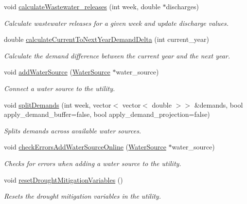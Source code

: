 \begin{DoxyCompactItemize}
void \mbox{\hyperlink{classUtility_a5feecc73d561de022eb6ba3c657b3dbc}{calculate\+Wastewater\+\_\+releases}} (int week, double $\ast$discharges)
\begin{DoxyCompactList}\small\item\em Calculate wastewater releases for a given week and update discharge values. \end{DoxyCompactList}\item 
double \mbox{\hyperlink{classUtility_a38381b003d13986e37757dfea683f7f9}{calculate\+Current\+To\+Next\+Year\+Demand\+Delta}} (int current\+\_\+year)
\begin{DoxyCompactList}\small\item\em Calculate the demand difference between the current year and the next year. \end{DoxyCompactList}\item 
void \mbox{\hyperlink{classUtility_aebbfd65c13e86cfeda8bdfbcc6712587}{add\+Water\+Source}} (\mbox{\hyperlink{classWaterSource}{Water\+Source}} $\ast$water\+\_\+source)
\begin{DoxyCompactList}\small\item\em Connect a water source to the utility. \end{DoxyCompactList}\item 
void \mbox{\hyperlink{classUtility_aca42b14087c3184d4fec10a2e8729c05}{split\+Demands}} (int week, vector$<$ vector$<$ double $>$$>$ \&demands, bool apply\+\_\+demand\+\_\+buffer=false, bool apply\+\_\+demand\+\_\+projection=false)
\begin{DoxyCompactList}\small\item\em Splits demands across available water sources. \end{DoxyCompactList}\item 
void \mbox{\hyperlink{classUtility_a0674d7d95f4d6595f7e01817a4d84a98}{check\+Errors\+Add\+Water\+Source\+Online}} (\mbox{\hyperlink{classWaterSource}{Water\+Source}} $\ast$water\+\_\+source)
\begin{DoxyCompactList}\small\item\em Checks for errors when adding a water source to the utility. \end{DoxyCompactList}\item 
void \mbox{\hyperlink{classUtility_af9ec9c2cb69166db021f03ce9ddf4d8e}{reset\+Drought\+Mitigation\+Variables}} ()
\begin{DoxyCompactList}\small\item\em Resets the drought mitigation variables in the utility. \end{DoxyCompactList}\item 
$$
\end{DoxyCompactItemize}
